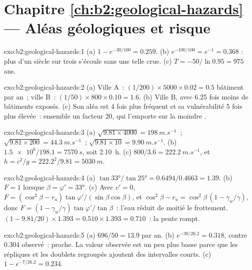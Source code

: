 \section*{Chapitre \ref{ch:b2:geological-hazards} --- Aléas géologiques et risque}

\begin{solution}{exo:b2:geological-hazards:1}
(a) $1 - e^{-30/100} = 0.259$. (b) $e^{-100/100} = e^{-1} = 0.368$ : plus d'un
siècle sur trois s'écoule sans une telle crue. (c) $T = -50/\ln 0.95 = 975$ ans.
\end{solution}

\begin{solution}{exo:b2:geological-hazards:2}
(a) Ville A~: $(1/200) \times 5000 \times 0.02 = 0.5$ bâtiment par an~; ville B~: $(1/50) \times 800
\times 0.10 = 1.6$. (b) Ville B, avec 6.25 fois moins de bâtiments exposés. (c) Son aléa est 4 fois plus fréquent et
sa vulnérabilité 5 fois plus élevée~: ensemble un facteur 20, qui l'emporte sur la
moindre .
\end{solution}

\begin{solution}{exo:b2:geological-hazards:3}
(a) $\sqrt{9.81 \times 4000} = \qty{198}{m.s^{-1}}$~; $\sqrt{9.81 \times 200} = \qty{44.3}{m.s^{-1}}$~;
$\sqrt{9.81 \times 10} = \qty{9.90}{m.s^{-1}}$. (b) $\num{1.5e6}/198.1 = \qty{7570}{s}$, soit
\qty{2.10}{h}. (c) $800/3.6 = \qty{222.2}{m.s^{-1}}$, et $h = c^2/g = 222.2^2/9.81 = \qty{5030}{m}$.
\end{solution}

\begin{solution}{exo:b2:geological-hazards:4}
(a) $\tan\ang{33}/\tan\ang{25} = 0.6494/0.4663 = 1.39$. (b) $F = 1$ lorsque $\beta = \varphi' =
\ang{33}$. (c) Avec $c' = 0$, $F = (\cos^2\beta - r_u)\tan\varphi'/(\sin\beta\cos\beta)$, et $\cos^2\beta
- r_u = \cos^2\beta\,(1 - \gamma_w/\gamma)$, donc $F = (1 - \gamma_w/\gamma)\tan\varphi'/\tan\beta$~:
l'eau réduit de moitié le frottement. $(1 - 9.81/20) \times 1.393 = 0.510 \times 1.393 = 0.710$~: la
pente rompt.
\end{solution}

\begin{solution}{exo:b2:geological-hazards:5}
(a) $696/50 = 13.9$ par an. (b) $e^{-30/26.2} = 0.318$, contre 0.304 observé~:
proche. La valeur observée est un peu plus basse parce que les répliques et les
doublets regroupés ajoutent des intervalles courts. (c) $1 - e^{-7/26.2} = 0.234$.
\end{solution}

